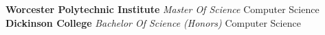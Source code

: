 %
%
%


\begin{scholarship}
					{\textbf{Worcester Polytechnic Institute} \emph{Master Of Science} Computer Science}
				{\textbf{Dickinson College} \emph{Bachelor Of Science (Honors)} Computer Science}
\end{scholarship}